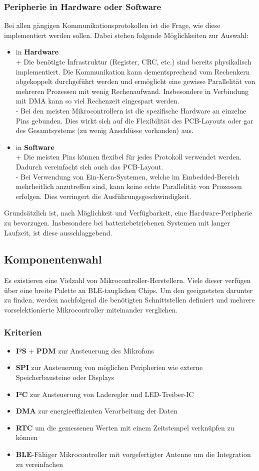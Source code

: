 \documentclass[12pt]{article}
\begin{document}
	\subsubsection*{Peripherie in Hardware oder Software}
	Bei allen gängigen Kommunikationsprotokollen ist die Frage, wie diese implementiert werden sollen. Dabei stehen folgende Möglichkeiten zur Auswahl:
	\begin{itemize}
		\item in \textbf{Hardware} \\
		+ Die benötigte Infrastruktur (Register, CRC, etc.) sind bereits physikalisch implementiert. Die Kommunikation kann dementsprechend vom Rechenkern abgekoppelt durchgeführt werden und ermöglicht eine gewisse Parallelität von mehreren Prozessen mit wenig Rechenaufwand. Insbesondere in Verbindung mit DMA kann so viel Rechenzeit eingespart werden. \\
		- Bei den meisten Mikrocontrollern ist die spezifische Hardware an einzelne Pins gebunden. Dies wirkt sich auf die Flexibilität des PCB-Layouts oder gar des Gesamtsystems (zu wenig Anschlüsse vorhanden) aus.
		\item in \textbf{Software} \\
		+ Die meisten Pins können flexibel für jedes Protokoll verwendet werden. Dadurch vereinfacht sich auch das PCB-Layout.\\
		- Bei Verwendung von Ein-Kern-Systemen, welche im Embedded-Bereich mehrheitlich anzutreffen sind, kann keine echte Parallelität von Prozessen erfolgen. Dies verringert die Ausführungsgeschwindigkeit.
	\end{itemize}
	Grundsätzlich ist, nach Möglichkeit und Verfügbarkeit, eine Hardware-Peripherie zu bevorzugen. Insbesondere bei batteriebetriebenen Systemen mit langer Laufzeit, ist diese ausschlaggebend.
	\subsection{Komponentenwahl}
	Es existieren eine Vielzahl von Mikrocontroller-Herstellern. Viele dieser verfügen über eine breite Palette an BLE-tauglichen Chips. Um den geeignetsten darunter zu finden, werden nachfolgend die benötigten Schnittstellen definiert und mehrere vorselektionierte Mikrocontroller miteinander verglichen.
	\subsubsection{Kriterien}
	\begin{itemize}
		\item \textbf{I²S} + \textbf{PDM} zur Ansteuerung des Mikrofons
		\item \textbf{SPI} zur Ansteuerung von möglichen Peripherien wie externe Speicher\-bausteine oder Displays
		\item \textbf{I²C} zur Ansteuerung von Laderegler und LED-Treiber-IC
		\item \textbf{DMA} zur energieeffizienten Verarbeitung der Daten
		\item \textbf{RTC} um die gemessenen Werten mit einem Zeitstempel verknüpfen zu können
		\item \textbf{BLE}-Fähiger Mikrocontroller mit vorgefertigter Antenne um die Integration zu vereinfachen
	\end{itemize}
\end{document}
